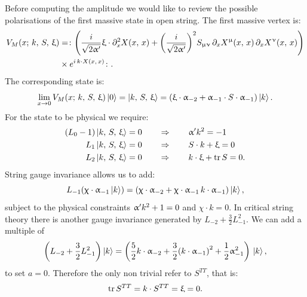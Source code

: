 Before computing the amplitude we would like to review the possible polarisations of the first massive state in open string.
The first massive vertex is:
\begin{equation}
  \begin{split}
  V_M\qty(x;\, k,\, S,\, \xi)
  & =
  \colon
    \qty(%
      \frac{i}{\sqrt{2 \ap}}
      \xi \cdot \ipd{x}^2 X\qty(x,\, x)
      +
      \qty( \frac{i}{\sqrt{2 \ap}} )^2
      S_{\mu\nu}\, \ipd{x} X^{\mu}\qty(x,\, x)\, \ipd{x} X^{\nu}\qty(x,\, x)
    )
  \\
  & \times
  e^{i\, k \cdot X\qty(x,\, x)}
  \colon.
  \end{split}
\end{equation}
The corresponding state is:
\begin{equation}
  \lim\limits_{x \rightarrow 0}
  V_M\qty(x;\, k,\, S,\, \upxi) \ket{0}
  =
  \ket{k,\, S,\, \upxi}
  =
  \qty( \upxi \cdot \upalpha_{-2} + \upalpha_{-1} \cdot S \cdot \upalpha_{-1} )
  \ket{k}.
\end{equation}
For the state to be physical we require:
\begin{align}
  \begin{split}
    \qty( L_0 - 1)
    \ket{k,\, S,\, \upxi}
    & =
    0
    \qquad \Rightarrow \qquad
    \upalpha' k^2 = -1
    \\
    L_1
    \ket{k,\, S,\, \upxi}
    & =
    0
    \qquad \Rightarrow \qquad
    S \cdot k + \upxi = 0
    \\
    L_2
    \ket{k,\, S,\, \upxi}
    & =
    0
    \qquad \Rightarrow \qquad
    k \cdot \upxi + \tr S = 0.
  \end{split}
\end{align}
String gauge invariance allows us to add:
\begin{equation}
  L_{-1}
  \qty( \upchi \cdot \upalpha_{-1} \ket{k} )
  =
  \qty( \upchi \cdot \upalpha_{-2} + \upchi \cdot \upalpha_{-1}\, k \cdot \upalpha_{-1} )
  \ket{k},
\end{equation}
subject to the physical constraints $\upalpha' k^2 + 1 = 0$ and $\chi \cdot k = 0$.
In critical string theory there is another gauge invariance generated by $L_{-2} + \frac{3}{2} L_{-1}^2$.
We can add a multiple of
\begin{equation}
  \qty( L_{-2} + \frac{3}{2} L_{-1}^2 )
  \ket{k} 
  =
  \qty(%
    \frac{5}{2} k \cdot \alpha_{-2}
    +
    \frac{3}{2} \qty(  k \cdot \alpha_{-1} )^2
    +
    \frac{1}{2} \alpha_{-1}^2
  )\,
  \ket{k},
\end{equation}
to set $a = 0$.
Therefore the only non trivial \dof refer to $S^{TT}$, that is:
\begin{equation}
  \tr S^{TT} = k \cdot S^{TT} = \upxi = 0.
\end{equation}
  
